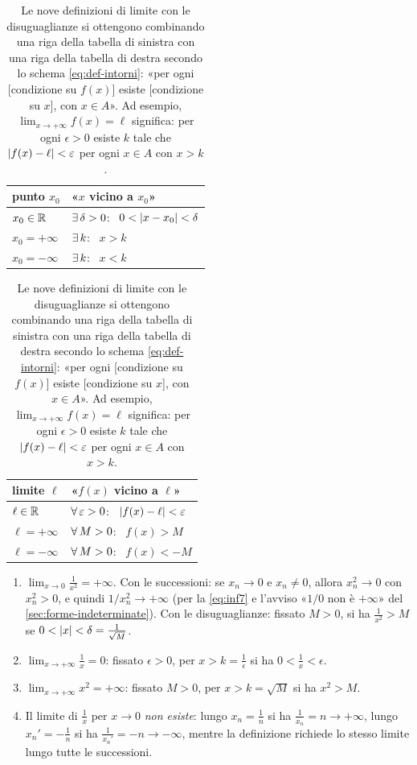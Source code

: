 \begin{table}[htb]
\centering
\small
\renewcommand{\arraystretch}{1.35}
\begin{tabular}{l l}
\toprule
punto $x_{0}$ & «$x$ vicino a $x_{0}$»\\
\midrule
$x_{0}\in\mathbb{R}$ & $\exists\,\delta>0$: \ $0<\lvert x-x_{0}\rvert<\delta$\\
$x_{0}=+\infty$ & $\exists\, k$: \ $x>k$\\
$x_{0}=-\infty$ & $\exists\, k$: \ $x<k$\\
\bottomrule
\end{tabular}
\qquad
\begin{tabular}{l l}
\toprule
limite $\ell$ & «$f(x)$ vicino a $\ell$»\\
\midrule
$\ell\in\mathbb{R}$ & $\forall\,\varepsilon>0$: \ $\lvert f(x)-\ell\rvert<\varepsilon$\\
$\ell=+\infty$ & $\forall\, M>0$: \ $f(x)>M$\\
$\ell=-\infty$ & $\forall\, M>0$: \ $f(x)<-M$\\
\bottomrule
\end{tabular}
\caption{Le nove definizioni di limite con le disuguaglianze si ottengono combinando una
riga della tabella di sinistra con una riga della tabella di destra secondo lo schema
\eqref{eq:def-intorni}: «per ogni [condizione su $f(x)$] esiste [condizione su $x$], con
$x\in A$». Ad esempio, $\lim_{x\to+\infty}f(x)=\ell$ significa: per ogni $\epsilon>0$
esiste $k$ tale che $\lvert f(x)-\ell\rvert<\varepsilon$ per ogni $x\in A$ con $x>k$.}
\label{tab:intorni}
\end{table}

\begin{esempio}\label{es:limiti-infiniti}
\begin{enumerate}[label=\textup{(\roman*)}]
  \item $\displaystyle\lim_{x\to0}\frac1{x^{2}}=+\infty$. Con le successioni: se
  $x_{n}\to0$ e $x_{n}\neq0$, allora $x_{n}^{2}\to0$ con $x_{n}^{2}>0$, e quindi
  $1/x_{n}^{2}\to+\infty$ (per la \eqref{eq:inf7} e l'avviso «$1/0$ non è $+\infty$»
  del \cref{sec:forme-indeterminate}). Con le
  disuguaglianze: fissato $M>0$, si ha $\frac1{x^{2}}>M$ se $0<\lvert x\rvert<\delta=\frac1{\sqrt M}$.
  \item $\displaystyle\lim_{x\to+\infty}\frac1x=0$: fissato $\epsilon>0$, per $x>k=\frac1\epsilon$
  si ha $0<\frac1x<\epsilon$.
  \item $\displaystyle\lim_{x\to+\infty}x^{2}=+\infty$: fissato $M>0$, per $x>k=\sqrt M$
  si ha $x^{2}>M$.
  \item Il limite di $\frac1x$ per $x\to0$ \emph{non esiste}: lungo $x_{n}=\frac1n$ si ha
  $\frac1{x_{n}}=n\to+\infty$, lungo $x_{n}'=-\frac1n$ si ha $\frac1{x_{n}'}=-n\to-\infty$,
  mentre la definizione richiede lo stesso limite lungo tutte le successioni.
\end{enumerate}
\end{esempio}

